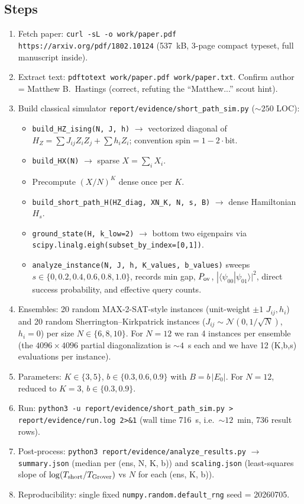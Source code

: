 \documentclass[11pt]{article}
\begin{document}
\subsection*{Steps}

\begin{enumerate}
\item Fetch paper: \texttt{curl -sL -o work/paper.pdf https://arxiv.org/pdf/1802.10124} (537~kB, 3-page compact typeset, full manuscript inside).
\item Extract text: \texttt{pdftotext work/paper.pdf work/paper.txt}. Confirm author = Matthew B.~Hastings (correct, refuting the ``Matthew...'' scout hint).
\item Build classical simulator \texttt{report/evidence/short\_path\_sim.py} (${\sim}250$ LOC):
  \begin{itemize}
    \item \texttt{build\_HZ\_ising(N, J, h)} $\to$ vectorized diagonal of $H_Z = \sum J_{ij} Z_iZ_j + \sum h_i Z_i$; convention spin$= 1-2\cdot\mathrm{bit}$.
    \item \texttt{build\_HX(N)} $\to$ sparse $X = \sum_i X_i$.
    \item Precompute $(X/N)^K$ dense once per $K$.
    \item \texttt{build\_short\_path\_H(HZ\_diag, XN\_K, N, s, B)} $\to$ dense Hamiltonian $H_s$.
    \item \texttt{ground\_state(H, k\_low=2)} $\to$ bottom two eigenpairs via \texttt{scipy.linalg.eigh(subset\_by\_index=[0,1])}.
    \item \texttt{analyze\_instance(N, J, h, K\_values, b\_values)} sweeps $s \in \{0,0.2,0.4,0.6,0.8,1.0\}$, records min gap, $P_{\rm ov}$, $|\langle\psi_{00}|\psi_{01}\rangle|^2$, direct success probability, and effective query counts.
  \end{itemize}
\item Ensembles: 20 random MAX-2-SAT-style instances (unit-weight $\pm 1$ $J_{ij}, h_i$) and 20 random Sherrington--Kirkpatrick instances ($J_{ij} \sim \mathcal{N}(0, 1/\sqrt{N})$, $h_i = 0$) per size $N \in \{6, 8, 10\}$. For $N=12$ we ran 4 instances per ensemble (the $4096\times 4096$ partial diagonalization is ${\sim}4$~s each and we have 12 (K,b,s) evaluations per instance).
\item Parameters: $K \in \{3, 5\}$, $b \in \{0.3, 0.6, 0.9\}$ with $B = b\,|E_0|$. For $N=12$, reduced to $K = 3$, $b \in \{0.3, 0.9\}$.
\item Run: \texttt{python3 -u report/evidence/short\_path\_sim.py > report/evidence/run.log 2>\&1} (wall time 716~s, i.e.\ ${\sim}12$~min, 736 result rows).
\item Post-process: \texttt{python3 report/evidence/analyze\_results.py} $\to$ \texttt{summary.json} (median per (ens, N, K, b)) and \texttt{scaling.json} (least-squares slope of $\log(T_{\rm short}/T_{\rm Grover})$ vs $N$ for each (ens, K, b)).
\item Reproducibility: single fixed \texttt{numpy.random.default\_rng} seed = 20260705.
\end{enumerate}
\end{document}
